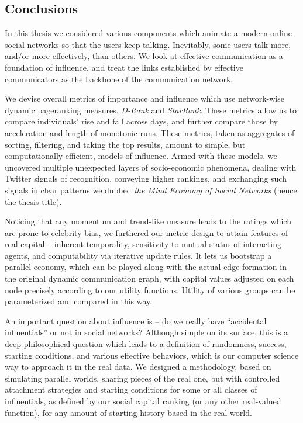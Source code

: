 \documentclass[10pt,oneside]{memoir}
\begin{document}
\begin{Spacing}{2}
\pagebreak \chapter{Conclusions}
\label{conclusions}

In this thesis we considered various components which animate a modern online social networks so that the users keep talking.  Inevitably, some users talk more, and/or more effectively, than others.  We look at effective communication as a foundation of influence, and treat the links established by effective communicators as the backbone of the communication network.  


We devise overall metrics of importance and influence which use network-wise dynamic pageranking measures, {\itshape D-Rank} and {\itshape StarRank}.  These metrics allow us to compare individuals' rise and fall across days, and further compare those by acceleration and length of monotonic runs.  These metrics, taken as aggregates of sorting, filtering, and taking the top results, amount to simple, but computationally efficient, models of influence.  Armed with these models, we uncovered multiple unexpected layers of socio-economic phenomena, dealing with Twitter signals of recognition, conveying higher rankings, and exchanging such signals in clear patterns we dubbed {\itshape the Mind Economy of Social Networks} (hence the thesis title).


Noticing that any momentum and trend-like measure leads to the ratings which are prone to celebrity bias, we furthered our metric design to attain features of real capital -- inherent temporality, sensitivity to mutual status of interacting agents, and computability via iterative update rules.  It lets us bootstrap a parallel economy, which can be played along with the actual edge formation in the original dynamic communication graph, with capital values adjusted on each node precisely according to our utility functions.  Utility of various groups can be parameterized and compared in this way.


An important question about influence is -- do we really have ``accidental influentials'' or not in social networks?  Although simple on its surface, this is a deep philosophical question which leads to a definition of randomness, success, starting conditions, and various effective behaviors, which is our computer science way to approach it in the real data.  We designed a methodology, based on simulating parallel worlds, sharing pieces of the real one, but with controlled attachment strategies and starting conditions for some or all classes of influentials, as defined by our social capital ranking (or any other real-valued function), for any amount of starting history based in the real world.  



\end{Spacing}
\end{document}
